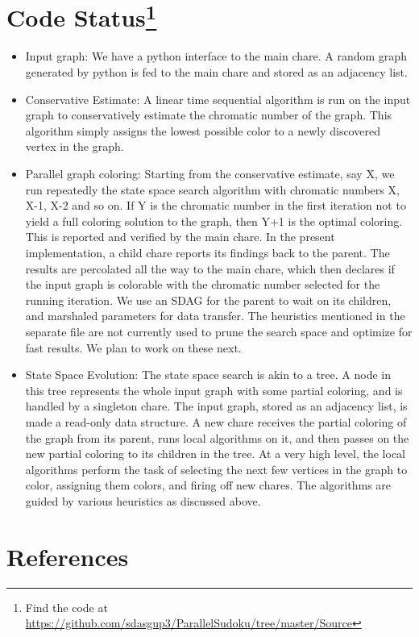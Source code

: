 \documentclass[10pt,twoside]{article}
\begin{document}
\section[Code Status]{Code Status\footnote{Find the code at \url{https://github.com/sdasgup3/ParallelSudoku/tree/master/Source} }}
\begin{itemize}

  \item Input graph: We have a python interface to the main chare. A random
    graph generated by python is fed to the main chare and stored as an
    adjacency list.  
    
  \item Conservative Estimate: A linear time sequential algorithm
    is run on the input graph to conservatively estimate the chromatic number
    of the graph. This algorithm simply assigns the lowest possible color to a
    newly discovered vertex in the graph.  
    
  \item Parallel graph coloring:  Starting from the conservative estimate, say
  X, we run repeatedly the state space search algorithm with chromatic numbers
  X, X-1, X-2 and so on. If Y is the chromatic number in the first iteration
  not to yield a full coloring solution to the graph, then Y+1 is the optimal
  coloring. This is reported and verified by the main chare.  In the present
  implementation, a child chare reports its findings back to the parent. The
  results are percolated all the way to the main chare, which then declares if
  the input graph is colorable with the chromatic number selected for the
  running iteration. We use an SDAG for the parent to wait on its children, and
  marshaled parameters for data transfer. The heuristics mentioned in the
  separate file are not currently used to prune the search space and optimize
  for fast results. We plan to work on these next.  
    
  \item  State Space Evolution: The state space search is akin to a tree. A
    node in this tree represents the whole input graph with some partial
    coloring, and is handled by a singleton chare. The input graph, stored as
    an adjacency list, is made a read-only data structure. A new chare receives
    the partial coloring of the graph from its parent, runs local algorithms on
    it, and then passes on the new partial coloring to its children in the
    tree. At a very high level, the local algorithms perform the task of
    selecting the next few vertices in the graph to color, assigning them
    colors, and firing off new chares. The algorithms are guided by various
    heuristics as discussed above.

\end{itemize}

\section{References}

\nocite{*}

\end{document}
